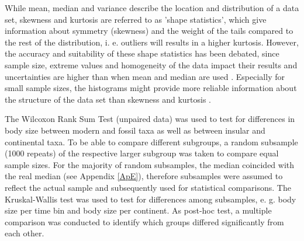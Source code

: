 While mean, median and variance describe the location and distribution of a data set, skewness and kurtosis are referred to as 'shape statistics', which give information about symmetry (skewness) and the weight of the tails compared to the rest of the distribution, i. e. outliers will results in a higher kurtosis. However, the accuracy and suitability of these shape statistics has been debated, since sample size, extreme values and homogeneity of the data impact their results and uncertainties are higher than when mean and median are used \citep{McNeese2016, Bai2005}. Especially for small sample sizes, the histograms might provide more reliable information about the structure of the data set than skewness and kurtosis \citep{McNeese2016}.

The Wilcoxon Rank Sum Test (unpaired data) was used to test for differences in body size between modern and fossil taxa as well as between insular and continental taxa. To be able to compare different subgroups, a random subsample (1000 repeats) of the respective larger subgroup was taken to compare equal sample sizes. For the majority of random subsamples, the median coincided with the real median (see Appendix \ref{ApE}), therefore subsamples were assumed to reflect the actual sample and subsequently used for statistical comparisons.
The Kruskal-Wallis test was used to test for differences among subsamples, e. g. body size per time bin and body size per continent.
As post-hoc test, a multiple comparison \citep{Siegel1988} was conducted to identify which groups differed significantly from each other.



